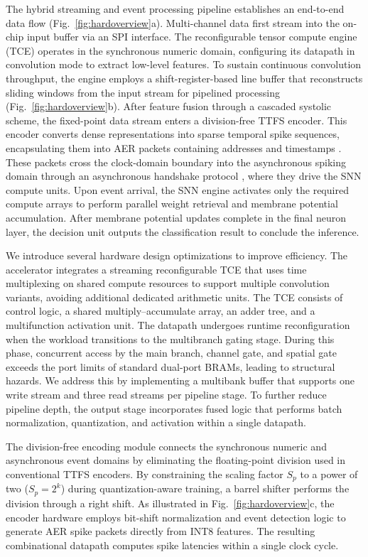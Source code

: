 \documentclass{nsr}
\begin{document}
The hybrid streaming and event processing pipeline establishes an end-to-end data flow (Fig.~\ref{fig:hardoverview}a). Multi-channel data first stream into the on-chip input buffer via an SPI interface. The reconfigurable tensor compute engine (TCE) operates in the synchronous numeric domain, configuring its datapath in convolution mode to extract low-level features. To sustain continuous convolution throughput, the engine employs a shift-register-based line buffer that reconstructs sliding windows from the input stream for pipelined processing (Fig.~\ref{fig:hardoverview}b). After feature fusion through a cascaded systolic scheme, the fixed-point data stream enters a division-free TTFS encoder. This encoder converts dense representations into sparse temporal spike sequences, encapsulating them into AER packets containing addresses and timestamps \cite{AER}. These packets cross the clock-domain boundary into the asynchronous spiking domain through an asynchronous handshake protocol \cite{ref66}, where they drive the SNN compute units. Upon event arrival, the SNN engine activates only the required compute arrays to perform parallel weight retrieval and membrane potential accumulation. After membrane potential updates complete in the final neuron layer, the decision unit outputs the classification result to conclude the inference.

We introduce several hardware design optimizations to improve efficiency. The accelerator integrates a streaming reconfigurable TCE that uses time multiplexing on shared compute resources to support multiple convolution variants, avoiding additional dedicated arithmetic units. The TCE consists of control logic, a shared multiply–accumulate array, an adder tree, and a multifunction activation unit. The datapath undergoes runtime reconfiguration when the workload transitions to the multibranch gating stage. During this phase, concurrent access by the main branch, channel gate, and spatial gate exceeds the port limits of standard dual-port BRAMs, leading to structural hazards. We address this by implementing a multibank buffer that supports one write stream and three read streams per pipeline stage. To further reduce pipeline depth, the output stage incorporates fused logic that performs batch normalization, quantization, and activation within a single datapath.

The division-free encoding module connects the synchronous numeric and asynchronous event domains by eliminating the floating-point division used in conventional TTFS encoders. By constraining the scaling factor $S_p$ to a power of two ($S_p=2^k$) during quantization-aware training, a barrel shifter performs the division through a right shift. As illustrated in Fig.~\ref{fig:hardoverview}c, the encoder hardware employs bit-shift normalization and event detection logic to generate AER spike packets directly from INT8 features. The resulting combinational datapath computes spike latencies within a single clock cycle.
\end{document}
